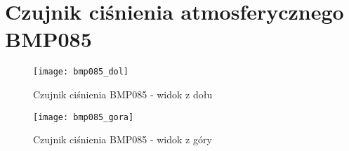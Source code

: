 \chapter{Czujnik ciśnienia atmosferycznego BMP085}
\begin{figure}[h]
\centering
\texttt{[image: bmp085\_dol]}
\caption{Czujnik ciśnienia BMP085 - widok z dołu}
\label{fig:bmp085_dol}
\end{figure}

\begin{figure}[h]
\centering
\texttt{[image: bmp085\_gora]}
\caption{Czujnik ciśnienia BMP085 - widok z góry}
\label{fig:bmp085_gora}
\end{figure}